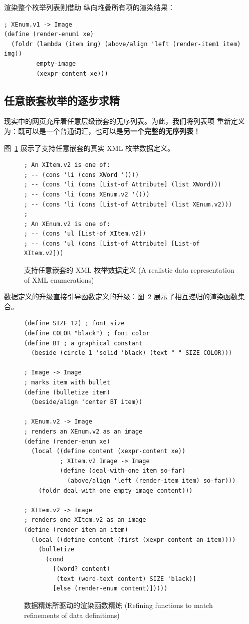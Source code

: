 渲染整个枚举列表则借助  纵向堆叠所有项的渲染结果：
\begin{lstlisting}[language=BSL]
; XEnum.v1 -> Image
(define (render-enum1 xe)
  (foldr (lambda (item img) (above/align 'left (render-item1 item) img))
         empty-image
         (xexpr-content xe)))
\end{lstlisting}

\subsection{任意嵌套枚举的逐步求精}

现实中的网页充斥着任意层级嵌套的无序列表。为此，我们将列表项  重新定义为：既可以是一个普通词汇，也可以是\textbf{另一个完整的无序列表}！

图~\ref{fig:127} 展示了支持任意嵌套的真实 XML 枚举数据定义。

\begin{figure}[htbp]
  \centering
\begin{lstlisting}[language=BSL, basicstyle=\scriptsize\ttfamily]
; An XItem.v2 is one of:
; -- (cons 'li (cons XWord '()))
; -- (cons 'li (cons [List-of Attribute] (list XWord)))
; -- (cons 'li (cons XEnum.v2 '()))
; -- (cons 'li (cons [List-of Attribute] (list XEnum.v2)))
;
; An XEnum.v2 is one of:
; -- (cons 'ul [List-of XItem.v2])
; -- (cons 'ul (cons [List-of Attribute] [List-of XItem.v2]))
\end{lstlisting}
  \caption{支持任意嵌套的 XML 枚举数据定义 (A realistic data representation of XML enumerations)}
  \label{fig:127}
\end{figure}

数据定义的升级直接引导函数定义的升级：图~\ref{fig:128} 展示了相互递归的渲染函数集合。

\begin{figure}[htbp]
  \centering
\begin{lstlisting}[language=BSL, basicstyle=\scriptsize\ttfamily]
(define SIZE 12) ; font size
(define COLOR "black") ; font color
(define BT ; a graphical constant
  (beside (circle 1 'solid 'black) (text " " SIZE COLOR)))

; Image -> Image
; marks item with bullet
(define (bulletize item)
  (beside/align 'center BT item))

; XEnum.v2 -> Image
; renders an XEnum.v2 as an image
(define (render-enum xe)
  (local ((define content (xexpr-content xe))
          ; XItem.v2 Image -> Image
          (define (deal-with-one item so-far)
            (above/align 'left (render-item item) so-far)))
    (foldr deal-with-one empty-image content)))

; XItem.v2 -> Image
; renders one XItem.v2 as an image
(define (render-item an-item)
  (local ((define content (first (xexpr-content an-item))))
    (bulletize
      (cond
        [(word? content)
         (text (word-text content) SIZE 'black)]
        [else (render-enum content)]))))
\end{lstlisting}
  \caption{数据精炼所驱动的渲染函数精炼 (Refining functions to match refinements of data definitions)}
  \label{fig:128}
\end{figure}

